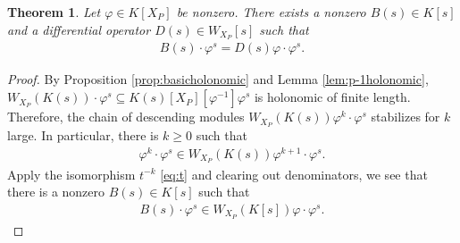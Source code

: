 \documentclass[11pt,a4paper,usenames,dvipsnames,reqno]{amsart}
\numberwithin{equation}{section}
\newtheorem{Thm}{Theorem}[section]
\theoremstyle{definition}
\theoremstyle{remark}
\begin{document}


\begin{Thm}\label{thm:gcd}
  Let $\varphi\in K[X_P]$ be nonzero. There exists a nonzero $B(s)\in K[s]$ and a differential operator $D(s)\in W_{X_P}[s]$ such that
    \begin{align*}
        B(s)\cdot \varphi^s=D(s)\varphi\cdot \varphi^{s}.
    \end{align*}
\end{Thm}

\begin{proof}
    By Proposition \ref{prop:basicholonomic} and Lemma \ref{lem:p-1holonomic}, $W_{X_P}(K(s))\cdot \varphi^s\subseteq K(s)[X_P][\varphi^{-1}]\varphi^s$ is holonomic of finite length.  Therefore, the chain of descending modules $W_{X_P}(K(s))\varphi^k\cdot \varphi^s$ stabilizes for $k$ large. In particular, there is $k\ge 0$ such that
    \begin{align*}
        \varphi^k\cdot \varphi^s\in W_{X_P}(K(s))\varphi^{k+1}\cdot \varphi^s.
    \end{align*}
    Apply the isomorphism $t^{-k}$ \eqref{eq:t} and clearing out denominators, we see that there is a nonzero $B(s)\in K[s]$ such that
    \begin{align*}
        B(s)\cdot \varphi^s\in W_{X_P}(K[s])\varphi\cdot \varphi^s.
    \end{align*}
\end{proof}
\end{document}
